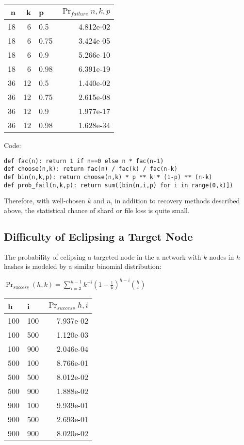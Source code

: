 \documentclass[a4paper,10pt]{article}
\begin{document}
\begin{table}[hbt!]
\begin{center}
\begin{tabular}{r r l r}
n & k & p & $\Pr_{failure}{n,k,p}$\\
\hline  18 & 6  &  0.5  & 4.812e-02\\
\hline  18 & 6  &  0.75 &3.424e-05\\
\hline  18 & 6  &  0.9  & 5.266e-10\\
\hline  18 & 6  &  0.98 &6.391e-19\\
\hline  36 & 12 &  0.5  &1.440e-02\\
\hline  36 & 12 &  0.75 &2.615e-08\\
\hline  36 & 12 &  0.9  &1.977e-17\\
\hline  36 & 12 &  0.98 &1.628e-34\\
\end{tabular}
\end{center}
\end{table}

Code:
\begin{lstlisting}
def fac(n): return 1 if n==0 else n * fac(n-1)
def choose(n,k): return fac(n) / fac(k) / fac(n-k)
def bin(n,k,p): return choose(n,k) * p ** k * (1-p) ** (n-k)
def prob_fail(n,k,p): return sum([bin(n,i,p) for i in range(0,k)])
\end{lstlisting}

Therefore, with well-chosen $ k $ and $ n $, in addition to recovery methods described above, the statistical chance of shard or file loss is quite small.

\subsection{Difficulty of Eclipsing a Target Node}
The probability of eclipsing a targeted node in the a network with $ k $ nodes in $ h $ hashes is modeled by a similar binomial distribution:

{\centering
$\Pr_{success}(h, k) = \displaystyle \sum_{i=3}^{h-1} k^{-i}(1-\frac{1}{k})^{h-i}{h \choose i}$
\\}

\begin{table}[hbt!]
\begin{center}
\begin{tabular}{l l r}
h & i & $\Pr_{success}{h,i}$\\
\hline  100 & 100 & 7.937e-02\\
\hline  100 & 500 & 1.120e-03\\
\hline  100 & 900 & 2.046e-04\\
\hline  500 & 100 & 8.766e-01\\
\hline  500 & 500 & 8.012e-02\\
\hline  500 & 900 & 1.888e-02\\
\hline  900 & 100 & 9.939e-01\\
\hline  900 & 500 & 2.693e-01\\
\hline  900 & 900 & 8.020e-02\\
\end{tabular}
\end{center}
\end{table}
\end{document}
